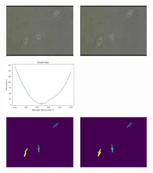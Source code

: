 \documentclass{article}
\begin{document}
\begin{figure}
    \centering
    \includegraphics[width=0.33\textwidth]
        {../docs/source/_static/fitting-methods/estimate-parameters1/microscopic-images-0.png}%
    \includegraphics[width=0.33\textwidth]
        {../docs/source/_static/fitting-methods/estimate-parameters1/microscopic-images-1.png}%
    \includegraphics[width=0.33\textwidth]
        {../docs/source/_static/fitting-methods/estimate-parameters1/Growth Rate.png}\\%
    \includegraphics[width=0.33\textwidth]
        {../docs/source/_static/fitting-methods/estimate-parameters1/microscopic-images-2.png}%
    \includegraphics[width=0.33\textwidth]
        {../docs/source/_static/fitting-methods/estimate-parameters1/microscopic-images-3.png}%

\end{figure}
\end{document}
